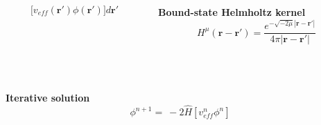 \documentclass[mathserif, 8pt]{beamer}
\begin{document}
\begin{frame}
\begin{columns}
\begin{column}{.5\textwidth}
\begin{equation}
	    \Big[v_{eff}(\boldsymbol{r}') \phi(\boldsymbol{r}')\Big] d\boldsymbol{r}'
    \end{equation}
    \end{column}
    \begin{column}{.5\textwidth}
    \centering
    \textbf{Bound-state Helmholtz kernel}
    \begin{equation}
	\nonumber
	H^\mu(\boldsymbol{r}-\boldsymbol{r}') = \frac{e^{-\sqrt{-2\mu}|\boldsymbol{r}-\boldsymbol{r}'|}}{4\pi|\boldsymbol{r}-\boldsymbol{r}'|}
    \end{equation}
    \end{column}
    \end{columns}
    \ \\
    \ \\
    \textbf{Iterative solution}
    \begin{equation}
	\nonumber
	\phi^{n+1} =\ -2\hat{H}\left[v_{eff}^n\phi^n\right]
    \end{equation}
\end{frame}
\end{document}
